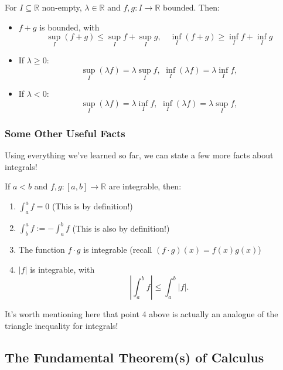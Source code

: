 \documentclass[
  17pt,
  a4paper]{extarticle}
\providecommand{\tightlist}{%
  \setlength{\itemsep}{0pt}\setlength{\parskip}{0pt}}
\theoremstyle{plain}
\theoremstyle{definition}
\theoremstyle{plain}
\theoremstyle{plain}
\theoremstyle{plain}
\theoremstyle{plain}
\theoremstyle{definition}
\theoremstyle{definition}
\theoremstyle{remark}
\theoremstyle{remark}
\let\BeginKnitrBlock\begin \let\EndKnitrBlock\end
\renewcommand{\;}{\,}
\begin{document}
\BeginKnitrBlock{proposition}
{\label{prp:prop1} }For \(I \subseteq \mathbb{R}\) non-empty, \(\lambda \in \mathbb{R}\) and \(f,g:I \to \mathbb{R}\) bounded. Then:

\begin{itemize}
\tightlist
\item
  \(f+g\) is bounded, with \[\sup_{I}(f + g) \leq \sup_{I}f + \sup_{I}g, \quad \inf_{I}(f + g) \geq \inf_{I}f + \inf_{I}g\]
\item
  If \(\lambda \geq 0\): \[\sup_{I}(\lambda f) = \lambda\sup_{I}f, \;\; \inf_{I}(\lambda f) = \lambda\inf_{I}f,\]
\item
  If \(\lambda < 0\): \[\sup_{I}(\lambda f) = \lambda\inf_{I}f, \;\; \inf_{I}(\lambda f) = \lambda\sup_{I}f,\]
\end{itemize}
\EndKnitrBlock{proposition}

\hypertarget{some-other-useful-facts}{%
\subsubsection{Some Other Useful Facts}\label{some-other-useful-facts}}

Using everything we've learned so far, we can state a few more facts about integrals!

\BeginKnitrBlock{proposition}
{\label{prp:prop2} }If \(a<b\) and \(f,g:[a,b] \to \mathbb{R}\) are integrable, then:

\begin{enumerate}
\def\labelenumi{\arabic{enumi})}
\tightlist
\item
  \(\int_a^a f = 0\) (This is by definition!)
\item
  \(\int_b^a f := -\int_a^b f\) (This is also by definition!)
\item
  The function \(f \cdot g\) is integrable (recall \((f\cdot g)(x) = f(x)g(x)\))
\item
  \(\lvert f \rvert\) is integrable, with \[\left\lvert\int_a^b f \right\rvert \leq \int_a^b \lvert f \rvert.\]
\end{enumerate}
\EndKnitrBlock{proposition}

It's worth mentioning here that point 4 above is actually an analogue of the triangle inequality for integrals!

\hypertarget{the-fundamental-theorems-of-calculus}{%
\subsection{The Fundamental Theorem(s) of Calculus}\label{the-fundamental-theorems-of-calculus}}
\end{document}

